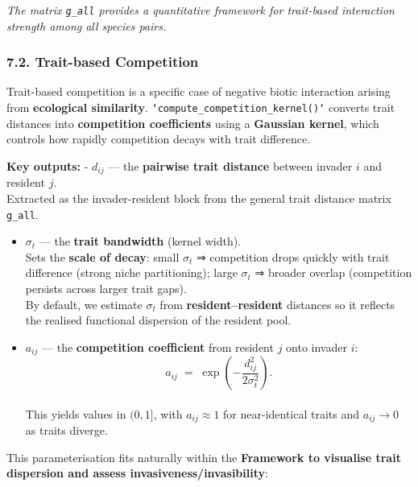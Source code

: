 \documentclass[
]{article}
\begin{document}
\emph{The matrix \texttt{g\_all} provides a quantitative framework for
trait-based interaction strength among all species pairs.}

\hypertarget{trait-based-competition}{%
\subsubsection{7.2. Trait-based
Competition}\label{trait-based-competition}}

Trait-based competition is a specific case of negative biotic
interaction arising from \textbf{ecological similarity}.
\texttt{`compute_competition_kernel()`} converts trait distances into
\textbf{competition coefficients} using a \textbf{Gaussian kernel},
which controls how rapidly competition decays with trait difference.

\textbf{Key outputs:} - \textbf{\(d_{ij}\)} --- the \textbf{pairwise
trait distance} between invader \(i\) and resident \(j\).\\
Extracted as the invader-resident block from the general trait distance
matrix \texttt{g\_all}.

\begin{itemize}
\item
  \textbf{\(\sigma_t\)} --- the \textbf{trait bandwidth} (kernel
  width).\\
  Sets the \textbf{scale of decay}: small \(\sigma_t\) ⇒ competition
  drops quickly with trait difference (strong niche partitioning); large
  \(\sigma_t\) ⇒ broader overlap (competition persists across larger
  trait gaps).\\
  By default, we estimate \(\sigma_t\) from \textbf{resident--resident}
  distances so it reflects the realised functional dispersion of the
  resident pool.
\item
  \textbf{\(a_{ij}\)} --- the \textbf{competition coefficient} from
  resident \(j\) onto invader \(i\):\\
  \[
    a_{ij} \;=\; \exp\!\left(- \frac{d_{ij}^2}{2\sigma_t^2}\right).
  \]\\
  This yields values in \((0,1]\), with \(a_{ij}\approx 1\) for
  near-identical traits and \(a_{ij}\to 0\) as traits diverge.
\end{itemize}

This parameterisation fits naturally within the \textbf{Framework to
visualise trait dispersion and assess invasiveness/invasibility}:
\end{document}
